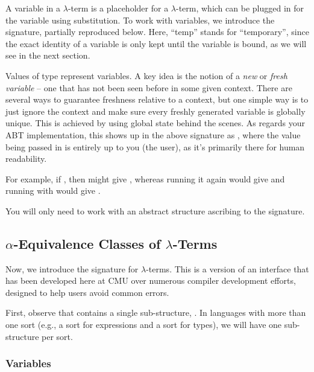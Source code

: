 \documentclass[11pt]{article}
\begin{document}
A variable in a $\lambda$-term is a placeholder for a $\lambda$-term, which can be plugged in for the variable using substitution.
To work with variables, we introduce the  signature, partially reproduced below.
Here, ``temp'' stands for ``temporary'', since the exact identity of a variable is only kept until the variable is bound, as we will see in the next section.


Values of type  represent variables.
A key idea is the notion of a \emph{new} or \emph{fresh variable} -- one that has not been seen before in some given context.
There are several ways to guarantee freshness relative to a context, but one simple way is to just ignore the context and make sure every freshly generated variable is globally unique.
This is achieved by using global state behind the scenes.
As regards your ABT implementation, this shows up in the above signature as , where the  value being passed in is entirely up to you (the user), as it's primarily there for human readability.

For example, if , then  might give , whereas running it again would give  and running with  would give .

You will only need to work with an abstract structure ascribing to the signature.

\subsection[Alpha-Equivalence Classes of Lambda-Terms]{$\alpha$-Equivalence Classes of $\lambda$-Terms}

Now, we introduce the signature for $\lambda$-terms.
This is a version of an interface that has been developed here at CMU over numerous compiler development efforts, designed to help users avoid common errors.


First, observe that  contains a single sub-structure, .
In languages with more than one sort (e.g., a sort for expressions and a sort for types), we will have one sub-structure per sort.

\subsubsection{Variables}
\end{document}
